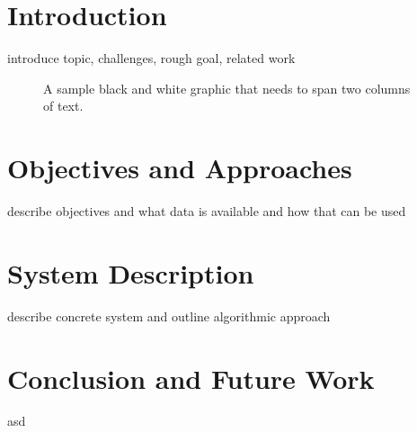 \section{Introduction}

introduce topic, challenges, rough goal, related work

\begin{figure*}
	\caption{A sample black and white graphic
		that needs to span two columns of text.}
\end{figure*}

\cite{chen2009exemplar}
\cite{dang2017cactustree}
\cite{efrat2015mapsets}
\cite{fortuna2005visualization}
\cite{fried2014maps}
\cite{gronemann2012drawing}
\cite{hildenbrand2016flexible}
\cite{pang2017creating}
\cite{sallaberry2016contact}
\cite{sen2017cartograph}
\cite{tao2017honvis}
\cite{wei2010tiara}
\cite{white2009exploratory}

\section{Objectives and Approaches}
describe objectives and what data is available and how that can be used

\section{System Description}
describe concrete system and outline algorithmic approach

\section{Conclusion and Future Work}
asd